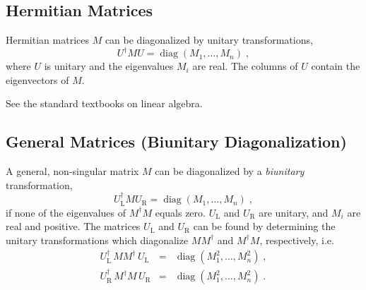 \documentclass[12pt,a4paper,twoside]{scrartcl}
\DeclareMathOperator{\diag}{diag}
\numberwithin{equation}{section}
\numberwithin{table}{section}
\begin{document}
\subsection*{Hermitian Matrices}
\begin{Theorem}
 Hermitian matrices $M$ can be diagonalized by unitary transformations,
 \begin{equation}
        U^\dagger M U = \diag(M_1,\dots,M_n) \;,
 \end{equation}
 where $U$ is unitary and the eigenvalues $M_i$ are real. The columns of
 $U$ contain the eigenvectors of $M$.
\end{Theorem}
\begin{Proof}
 See the standard textbooks on linear algebra.
\end{Proof}

\subsection*{General Matrices (Biunitary Diagonalization)}
\begin{Theorem} \label{th:BiunitaryDiag}
 A general, non-singular matrix $M$ can be diagonalized by a 
 \emph{biunitary} transformation,
 \begin{equation} \label{eq:BiunitaryDiag}
        U_\mathrm{L}^\dagger M U_\mathrm{R} = \diag(M_1,\dots,M_n) \;,
 \end{equation}
 if none of the eigenvalues of $M^\dagger M$ equals zero.
 $U_\mathrm{L}$ and $U_\mathrm{R}$ are unitary, and $M_i$ are real and
 positive.
 The matrices $U_\mathrm{L}$ and $U_\mathrm{R}$ can be found by
 determining the unitary transformations which diagonalize $M M^\dagger$
 and $M^\dagger M$, respectively, i.e.\
 \begin{subequations}
 \begin{eqnarray}
        U_\mathrm{L}^\dagger \, M M^\dagger \, U_\mathrm{L} &=&
         \diag(M_1^2,\dots,M_n^2) \;,
 \\
        U_\mathrm{R}^\dagger \, M^\dagger M \, U_\mathrm{R} &=&
         \diag(M_1^2,\dots,M_n^2) \;.
        \label{eq:DefUR}
 \end{eqnarray}
 \end{subequations}
\end{Theorem}
\end{document}
